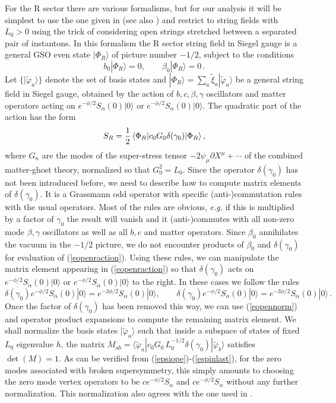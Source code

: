 \documentclass[12pt,a4paper]{article}
\newcommand{\be}{\begin{equation}}
\newcommand{\ee}{\end{equation}}
\newcommand{\refb}[1]{(\ref{#1})}
\newcommand{\p}{\partial}
\newcommand{\vp}{\varphi}
\newcommand{\dalpha}{\beta}
\def\dalpha{{\dot\alpha}}
\begin{document}
For the R sector there are various formalisms, but for our analysis it will be simplest to use the
one given in \cite{Kunitomo:2015usa,Kunitomo:2016bhc}
(see also \cite{Kazama:1985hd,Kazama:1986cy,Terao:1986ex})
and restrict to string fields with $L_0>0$ using the trick of considering open strings
stretched between a separated pair of instantons. In this formalism the R sector string
field in Siegel gauge
is a general GSO even state $|\Phi_R\rangle$ of  picture number $-1/2$, subject to the conditions
\be
b_0|\Phi_R\rangle=0,
\qquad
\beta_0|\Phi_R\rangle=0\, .
\ee
Let $\{|\tilde \vp_a\rangle\}$ denote the set of basis states and
$|\Phi_{R}\rangle = \sum_a \tilde\xi_a |\tilde\vp_a\rangle$ be a general string field in Siegel gauge,
obtained by the action of $b,c,\beta,\gamma$ oscillators and matter operators
acting on $e^{-\phi/2}S_\alpha(0)|0\rangle$ or $e^{-\phi/2}S_\dalpha(0)|0\rangle$.
The quadratic part of the action has the form
\be
\label{eopenraction}
S_R= {1\over 2} \, \langle \Phi_{R}|c_0 G_0 \delta(\gamma_0)|\Phi_{R}\rangle \, ,
\ee
where $G_n$ are the modes of the super-stress tensor $-2\psi_\mu\p X^\mu+\cdots$
of the combined matter-ghost theory, normalized so that $G_0^2=L_0$.
Since the operator $\delta(\gamma_0)$ has not been introduced before, we need to describe
how to compute matrix elements of $\delta(\gamma_0)$. It is a Grassmann odd operator
with specific (anti-)commutation rules with the usual operators.
Most of the rules are obvious, {\it e.g.}
if this is multiplied by a factor of $\gamma_0$ the result will vanish and it (anti-)commutes with
all non-zero mode $\beta,\gamma$ oscillators as well as all $b,c$ and
matter operators. Since $\beta_0$ annihilates the vacuum in the $-1/2$ picture,
we do not encounter products of $\beta_0$ and $\delta(\gamma_0)$ for evaluation of \refb{eopenraction}.
Using these rules, we can manipulate the matrix element appearing in \refb{eopenraction} so that
$\delta(\gamma_0)$ acts on $e^{-\phi/2}S_\alpha(0)|0\rangle$ or
$e^{-\phi/2}S_\dalpha(0)|0\rangle$ to the right.
In these cases we follow the rules
\be
\label{e3.5new}
\delta(\gamma_0) e^{-\phi/2}S_\alpha(0)|0\rangle=e^{-3\phi/2}S_\alpha(0)|0\rangle,
\qquad \delta(\gamma_0) e^{-\phi/2}S_\dalpha(0)|0\rangle=e^{-3\phi/2}S_\dalpha(0)|0\rangle\, .
\ee
Once the factor of $\delta(\gamma_0)$ has been
removed this way, we can use \refb{eopennorm} and operator product expansions
to compute the remaining matrix element.
We shall normalize the basis states
$|\tilde\vp_a\rangle$ such that inside a subspace of states of fixed $L_0$ eigenvalue $h$,
the matrix
$ M_{ab}=\langle \tilde\vp_a|c_0 {G_0\, L_0^{-1/2}}  \delta(\gamma_0)|\tilde\vp_b\rangle$
satisfies $\det(M)=1$. As can be verified from \refb{epsiope}-\refb{espinlast},
for the zero modes associated with broken supersymmetry, this simply amounts to
choosing the zero mode vertex operators to be $ce^{-\phi/2}S_\alpha$ and
$ce^{-\phi/2}S_\dalpha$ without any further normalization.
This normalization also agrees with the one used in \cite{Sen:2021tpp,Alexandrov:2021shf,Alexandrov:2021dyl}.
\end{document}
